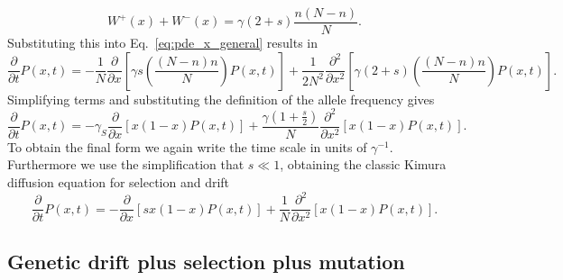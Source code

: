 \begin{equation}
    W^+(x) + W^-(x) = \gamma (2 + s) \frac{n(N-n)}{N}.
\end{equation}
Substituting this into Eq.~\ref{eq:pde_x_general} results in
\begin{equation}
    \frac{\partial}{\partial t} P(x, t) =
    -\frac{1}{N} 
    \frac{\partial}{\partial x}
    \left[\gamma s \left(\frac{(N-n) n}{N}\right) P(x, t)\right] 
    +\frac{1}{2 N^{2}} 
    \frac{\partial^{2}}{\partial x^{2}}
    \left[\gamma (2+s)\left(\frac{(N-n) n}{N}\right) P(x, t)\right].
\end{equation}
Simplifying terms and substituting the definition of the allele frequency gives
\begin{equation}
    \frac{\partial}{\partial t} P(x, t) =
    -\gamma_{S} \frac{\partial}{\partial x}[x(1-x) P(x, t)] 
    +\frac{\gamma\left(1+\frac{s}{2}\right)}{N}
    \frac{\partial^{2}}{\partial x^{2}}[x(1-x) P(x, t)].
\end{equation}
To obtain the final form we again write the time scale in units of
$\gamma^{-1}$. Furthermore we use the simplification that $s \ll 1$, obtaining
the classic Kimura diffusion equation for selection and drift
\begin{equation}
    \frac{\partial}{\partial t} P(x, t) =
    -\frac{\partial}{\partial x}[s x(1-x) P(x, t)] 
    +\frac{1}{N} \frac{\partial^{2}}{\partial x^{2}}[x(1-x) P(x, t)].
\end{equation}

\subsection{Genetic drift plus selection plus mutation}

